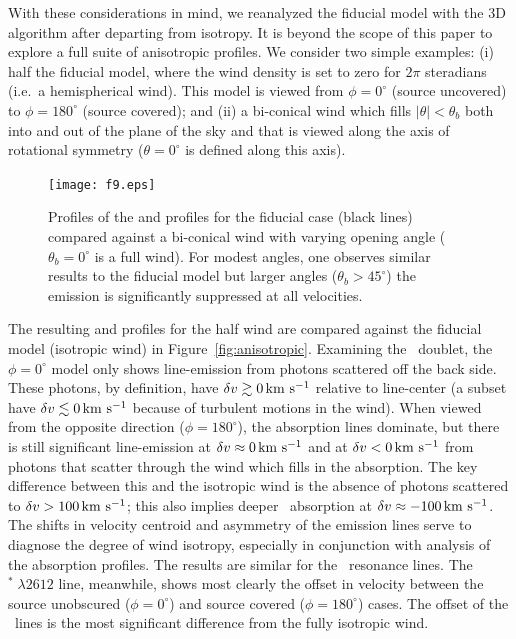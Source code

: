 \documentclass[]{emulateapj}
\begin{document}
With these considerations in mind, we reanalyzed the fiducial model
with the 3D algorithm after departing from isotropy.  It is beyond the
scope of this paper to explore a full suite of anisotropic profiles.
We consider two simple examples: (i) half the fiducial model, where 
the wind density is set to zero for $2\pi$ steradians (i.e.\ a
hemispherical wind).  This model is
viewed from $\phi = 0^\circ$ (source uncovered) 
to $\phi = 180^\circ$ (source covered); and 
(ii) a bi-conical wind which fills 
$|\theta| < \theta_b$ both into and out of the plane of the sky and that is
viewed along the axis of rotational symmetry ($\theta = 0^\circ$ is
defined along this axis).

\begin{figure}
\texttt{[image: f9.eps]}
\caption{
Profiles of the  and  profiles for the fiducial
case (black lines) compared against a bi-conical wind with varying
opening angle ($\theta_b = 0^\circ$ is a full wind).  For modest angles, one
observes similar results to the fiducial model but larger angles
($\theta_b > 45^\circ$) the emission is significantly suppressed at
all velocities.  
}
\label{fig:biconical}
\end{figure}


The resulting  and
 profiles for the half wind are compared against the fiducial model
(isotropic wind) in Figure~\ref{fig:anisotropic}.  
Examining the \mgiid\ doublet, 
the $\phi = 0^\circ$ model only shows
line-emission from photons scattered
off the back side.  These photons, by definition, have $\delta v \gtrsim 0 \, {\rm km~s^{-1}}$
relative to line-center (a subset have $\delta v \lesssim 0 \, {\rm km~s^{-1}}$ because
of turbulent motions in the wind). 
When viewed from the opposite direction ($\phi = 180^\circ$), the
absorption lines dominate, but there is still significant
line-emission at $\delta v \approx 0 \, {\rm km~s^{-1}}$ and at $\delta v < 0 \, {\rm km~s^{-1}}$ 
from photons that scatter through the wind
which fills in the absorption. 
The key difference between this and the isotropic wind is the absence of photons
scattered to $\delta v > 100 \, {\rm km~s^{-1}}$;  this also implies deeper 
\mgiib\ absorption at $\delta v \approx -100 \, {\rm km~s^{-1}}$. The 
shifts in velocity centroid and asymmetry of the emission lines
serve to diagnose the degree of wind isotropy, especially in
conjunction with analysis of the absorption profiles. 
The results are similar for the \feiid\ resonance lines.  The
$^* \; \lambda 2612$ line, meanwhile, shows most clearly the
offset in velocity between the source unobscured ($\phi = 0^\circ$)
and source covered ($\phi = 180^\circ$) cases.  The offset of the
\feiis\ lines is the most significant 
difference from the fully isotropic wind.
\end{document}
